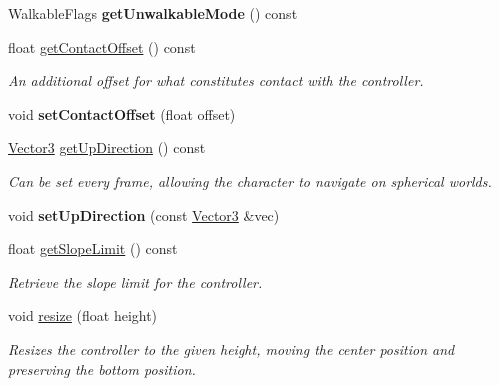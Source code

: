 \begin{Indent}
\begin{DoxyCompactItemize}
\mbox{\label{classrev_1_1_character_controller_ad015a9d99792dca6b19ec232410d917f}} 
Walkable\+Flags {\bfseries get\+Unwalkable\+Mode} () const
\item 
\mbox{\label{classrev_1_1_character_controller_a200e81c65f922422e7071130dc044d71}} 
float \mbox{\hyperlink{classrev_1_1_character_controller_a200e81c65f922422e7071130dc044d71}{get\+Contact\+Offset}} () const
\begin{DoxyCompactList}\small\item\em An additional offset for what constitutes contact with the controller. \end{DoxyCompactList}\item 
\mbox{\label{classrev_1_1_character_controller_ae29e1674243146f7eb7fac6afc531d2d}} 
void {\bfseries set\+Contact\+Offset} (float offset)
\item 
\mbox{\hyperlink{classrev_1_1_vector}{Vector3}} \mbox{\hyperlink{classrev_1_1_character_controller_ada6bfbcc3bb49626a720a09aed9a3fe8}{get\+Up\+Direction}} () const
\begin{DoxyCompactList}\small\item\em Can be set every frame, allowing the character to navigate on spherical worlds. \end{DoxyCompactList}\item 
\mbox{\label{classrev_1_1_character_controller_a356769dd23ff002829bf826a815a4b32}} 
void {\bfseries set\+Up\+Direction} (const \mbox{\hyperlink{classrev_1_1_vector}{Vector3}} \&vec)
\item 
float \mbox{\hyperlink{classrev_1_1_character_controller_a6ea84a3fbd399d2e57a8c37b45971cba}{get\+Slope\+Limit}} () const
\begin{DoxyCompactList}\small\item\em Retrieve the slope limit for the controller. \end{DoxyCompactList}\item 
\mbox{\label{classrev_1_1_character_controller_a5f84850b33838038d18167650a7411b0}} 
void \mbox{\hyperlink{classrev_1_1_character_controller_a5f84850b33838038d18167650a7411b0}{resize}} (float height)
\begin{DoxyCompactList}\small\item\em Resizes the controller to the given height, moving the center position and preserving the bottom position. \end{DoxyCompactList}\end{DoxyCompactItemize}
\end{Indent}
